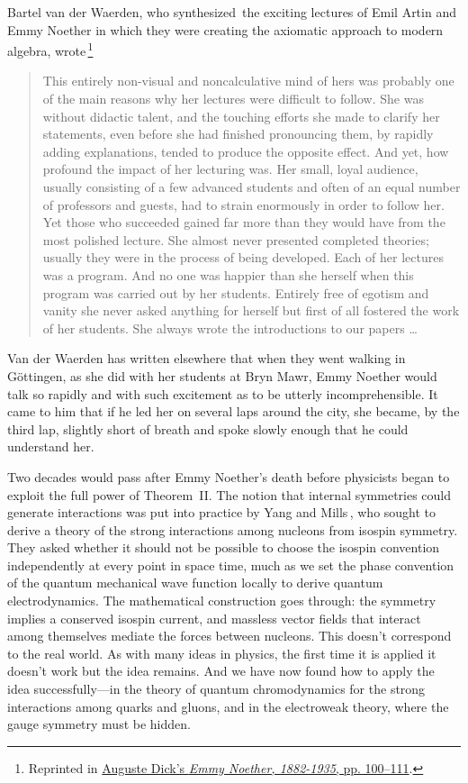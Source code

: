 \documentclass[twoside,symmetric]{tufte-handout}
\begin{document}
Bartel van der Waerden, who synthesized$\,$\cite{waerden1991algebra} the exciting lectures of Emil Artin and Emmy Noether in which they were creating the axiomatic approach  to modern algebra, wrote$\,$\footnote{Reprinted in \hyperref[auguste]{Auguste Dick's \emph{Emmy Noether, 1882-1935}, pp. 100--111}.}
\begin{quote}
This entirely non-visual and noncalculative mind of hers was probably one of the main reasons why her lectures were difficult to follow. She was without didactic talent, and the touching efforts she made to clarify her statements, even before she had finished pronouncing them, by rapidly adding explanations, tended to produce the opposite effect. And yet, how profound the impact of her lecturing was. Her small, loyal audience, usually consisting of a few advanced students and often of an equal number of professors and guests, had to strain enormously in order to follow her. Yet those who succeeded gained far more than they would have from the most polished lecture. She almost never presented completed theories; usually they were in the process of being developed. Each of her lectures was a program. And no one was happier than she herself when this program was carried out by her students. Entirely free of egotism and vanity she never asked anything for herself but first of all fostered the work of her students. She always wrote the introductions to our papers \ldots
\end{quote}
\noindent Van der Waerden has written elsewhere that when they went walking in G\"ottingen, as she did with her students at Bryn Mawr, Emmy Noether would talk so rapidly and with such excitement as to be utterly incomprehensible. It came to him that if he led her on several laps around the city, she became, by the third lap, slightly short of breath and spoke slowly enough that he could understand her.

 Two decades would pass after Emmy Noether's death before physicists began to exploit the full power of Theorem~II. The notion that internal symmetries could generate interactions was put into practice by Yang and Mills$\,$\cite{Yang:1954ek}, who sought to derive a theory of the strong interactions among nucleons from isospin symmetry. They asked whether it should not be possible to choose the isospin convention independently at every point in space time, much as we set the phase convention of the quantum mechanical wave function locally to derive quantum electrodynamics. The mathematical construction goes through: the symmetry implies a conserved isospin current, and massless vector fields that interact among themselves mediate the forces between nucleons. This doesn't correspond to the real world. As with many ideas in physics, the first time it is applied it doesn't work but the idea remains. And we have now found how to apply the idea successfully---in the theory of quantum chromodynamics for the strong interactions among quarks and gluons, and in the electroweak theory, where the gauge symmetry must be hidden.
\end{document}
